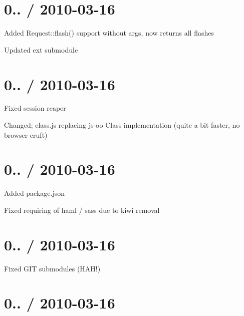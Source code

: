 {\ttfamily \section*{0.. / 2010-\/03-\/16 }}

{\ttfamily }

{\ttfamily 
\begin{DoxyItemize}
\item Added Request\+::flash() support without args, now returns all flashes
\item Updated ext submodule
\end{DoxyItemize}}

{\ttfamily \section*{0.. / 2010-\/03-\/16 }}

{\ttfamily }

{\ttfamily 
\begin{DoxyItemize}
\item Fixed session reaper
\item Changed; class.\+js replacing js-\/oo Class implementation (quite a bit faster, no browser cruft)
\end{DoxyItemize}}

{\ttfamily \section*{0.. / 2010-\/03-\/16 }}

{\ttfamily }

{\ttfamily 
\begin{DoxyItemize}
\item Added package.\+json
\item Fixed requiring of haml / sass due to kiwi removal
\end{DoxyItemize}}

{\ttfamily \section*{0.. / 2010-\/03-\/16 }}

{\ttfamily }

{\ttfamily 
\begin{DoxyItemize}
\item Fixed G\+IT submodules (H\+A\+H!)
\end{DoxyItemize}}

{\ttfamily \section*{0.. / 2010-\/03-\/16 }}

